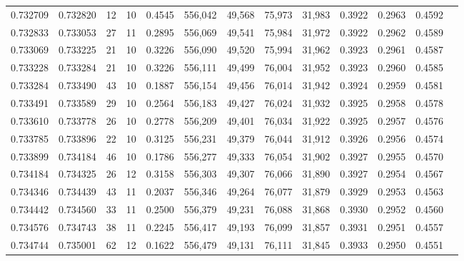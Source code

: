 \begin{tabular}{rrrrrrrrrrrrr}
0.732709 & 0.732820 &    12 &  10 &                                     0.4545 & 556,042 &  49,568 &  75,973 &  31,983 & 0.3922 & 0.2963 & 0.4592 \\
0.732833 & 0.733053 &    27 &  11 &                                     0.2895 & 556,069 &  49,541 &  75,984 &  31,972 & 0.3922 & 0.2962 & 0.4589 \\
0.733069 & 0.733225 &    21 &  10 &                                     0.3226 & 556,090 &  49,520 &  75,994 &  31,962 & 0.3923 & 0.2961 & 0.4587 \\
0.733228 & 0.733284 &    21 &  10 &                                     0.3226 & 556,111 &  49,499 &  76,004 &  31,952 & 0.3923 & 0.2960 & 0.4585 \\
0.733284 & 0.733490 &    43 &  10 &                                     0.1887 & 556,154 &  49,456 &  76,014 &  31,942 & 0.3924 & 0.2959 & 0.4581 \\
0.733491 & 0.733589 &    29 &  10 &                                     0.2564 & 556,183 &  49,427 &  76,024 &  31,932 & 0.3925 & 0.2958 & 0.4578 \\
0.733610 & 0.733778 &    26 &  10 &                                     0.2778 & 556,209 &  49,401 &  76,034 &  31,922 & 0.3925 & 0.2957 & 0.4576 \\
0.733785 & 0.733896 &    22 &  10 &                                     0.3125 & 556,231 &  49,379 &  76,044 &  31,912 & 0.3926 & 0.2956 & 0.4574 \\
0.733899 & 0.734184 &    46 &  10 &                                     0.1786 & 556,277 &  49,333 &  76,054 &  31,902 & 0.3927 & 0.2955 & 0.4570 \\
0.734184 & 0.734325 &    26 &  12 &                                     0.3158 & 556,303 &  49,307 &  76,066 &  31,890 & 0.3927 & 0.2954 & 0.4567 \\
0.734346 & 0.734439 &    43 &  11 &                                     0.2037 & 556,346 &  49,264 &  76,077 &  31,879 & 0.3929 & 0.2953 & 0.4563 \\
0.734442 & 0.734560 &    33 &  11 &                                     0.2500 & 556,379 &  49,231 &  76,088 &  31,868 & 0.3930 & 0.2952 & 0.4560 \\
0.734576 & 0.734743 &    38 &  11 &                                     0.2245 & 556,417 &  49,193 &  76,099 &  31,857 & 0.3931 & 0.2951 & 0.4557 \\
0.734744 & 0.735001 &    62 &  12 &                                     0.1622 & 556,479 &  49,131 &  76,111 &  31,845 & 0.3933 & 0.2950 & 0.4551 \\

\end{tabular}
